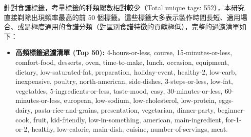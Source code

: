 針對食譜標籤，考量標籤的種類總數相對較少（Total unique tags: 552），本研究直接剃除出現頻率最高的前 50 個標籤。這些標籤大多表示製作時間長短、適用場合、或是極度通用的食譜分類（對區別食譜特徵的貢獻極低），完整的過濾清單如下：

\begin{itemize}[leftmargin=2em]
  \item \textbf{高頻標籤過濾清單 (Top 50):} 4-hours-or-less, course, 15-minutes-or-less, comfort-food, desserts, oven, time-to-make, lunch, occasion, equipment, dietary, low-saturated-fat, preparation, holiday-event, healthy-2, low-carb, inexpensive, poultry, north-american, side-dishes, 3-steps-or-less, low-fat, vegetables, 5-ingredients-or-less, taste-mood, easy, 30-minutes-or-less, 60-minutes-or-less, european, low-sodium, low-cholesterol, low-protein, eggs-dairy, pasta-rice-and-grains, presentation, vegetarian, dinner-party, beginner-cook, fruit, kid-friendly, low-in-something, american, main-ingredient, for-1-or-2, healthy, low-calorie, main-dish, cuisine, number-of-servings, meat.
\end{itemize}
